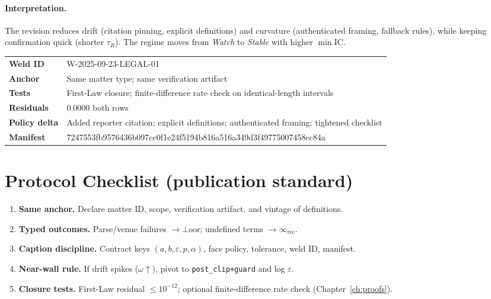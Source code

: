 \paragraph{Interpretation.}
The revision reduces drift (citation pinning, explicit definitions) and curvature (authenticated framing, fallback rules), while keeping confirmation quick (shorter \(\tau_R\)). The regime moves from \emph{Watch} to \emph{Stable} with higher \(\min\mathrm{IC}\).

\begin{eqbox}
\small
\begin{tabularx}{\linewidth}{@{}>{\bfseries}l X@{}}
Weld ID       & W-2025-09-23-LEGAL-01 \\
Anchor        & Same matter type; same verification artifact \\
Tests         & First-Law closure; finite-difference rate check on identical-length intervals \\
Residuals     & $0.0000$ both rows \\
Policy delta  & Added reporter citation; explicit definitions; authenticated framing; tightened checklist \\
Manifest      & 7247553fb9576436b097cc0f1e24f5194b816a516a349d3f49775007458cc84a \\
\end{tabularx}
\end{eqbox}


\section{Protocol Checklist (publication standard)}
\begin{enumerate}[leftmargin=1.25em]
  \item \textbf{Same anchor.} Declare matter ID, scope, verification artifact, and vintage of definitions.
  \item \textbf{Typed outcomes.} Parse/venue failures \(\rightarrow \bot\!\mathrm{oor}\); undefined terms \(\rightarrow \infty_{\mathrm{rec}}\).
  \item \textbf{Caption discipline.} Contract keys \((a,b,\varepsilon,p,\alpha)\), face policy, tolerance, weld ID, manifest.
  \item \textbf{Near-wall rule.} If drift spikes (\(\omega\uparrow\)), pivot to \texttt{post\_clip+guard} and log \(\varepsilon\).
  \item \textbf{Closure tests.} First-Law residual \(\le 10^{-12}\); optional finite-difference rate check (Chapter~\ref{ch:proofs}).
\end{enumerate}

